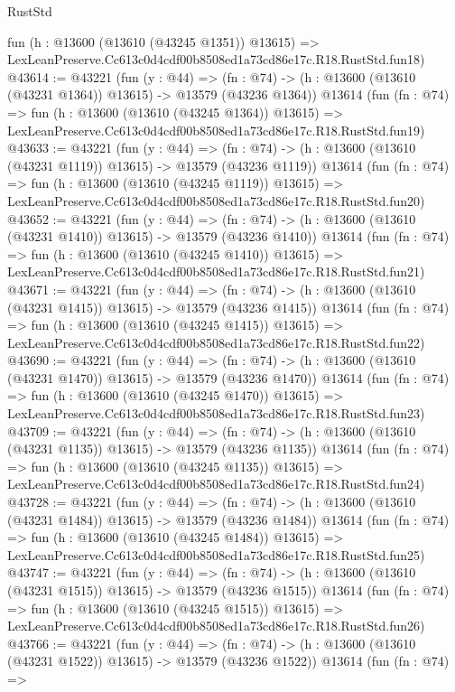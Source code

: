 \begin{lexlean}{RustStd}
\begin{coremodule}
    fun (h : @13600 (@13610 (@43245 @1351)) @13615) =>
    LexLeanPreserve.Cc613c0d4cdf00b8508ed1a73cd86e17c.R18.RustStd.fun18)
@43614 := @43221
    (fun (y : @44) =>
    (fn : @74) -> (h : @13600 (@13610 (@43231 @1364)) @13615) -> @13579 (@43236 @1364))
    @13614
    (fun (fn : @74) =>
    fun (h : @13600 (@13610 (@43245 @1364)) @13615) =>
    LexLeanPreserve.Cc613c0d4cdf00b8508ed1a73cd86e17c.R18.RustStd.fun19)
@43633 := @43221
    (fun (y : @44) =>
    (fn : @74) -> (h : @13600 (@13610 (@43231 @1119)) @13615) -> @13579 (@43236 @1119))
    @13614
    (fun (fn : @74) =>
    fun (h : @13600 (@13610 (@43245 @1119)) @13615) =>
    LexLeanPreserve.Cc613c0d4cdf00b8508ed1a73cd86e17c.R18.RustStd.fun20)
@43652 := @43221
    (fun (y : @44) =>
    (fn : @74) -> (h : @13600 (@13610 (@43231 @1410)) @13615) -> @13579 (@43236 @1410))
    @13614
    (fun (fn : @74) =>
    fun (h : @13600 (@13610 (@43245 @1410)) @13615) =>
    LexLeanPreserve.Cc613c0d4cdf00b8508ed1a73cd86e17c.R18.RustStd.fun21)
@43671 := @43221
    (fun (y : @44) =>
    (fn : @74) -> (h : @13600 (@13610 (@43231 @1415)) @13615) -> @13579 (@43236 @1415))
    @13614
    (fun (fn : @74) =>
    fun (h : @13600 (@13610 (@43245 @1415)) @13615) =>
    LexLeanPreserve.Cc613c0d4cdf00b8508ed1a73cd86e17c.R18.RustStd.fun22)
@43690 := @43221
    (fun (y : @44) =>
    (fn : @74) -> (h : @13600 (@13610 (@43231 @1470)) @13615) -> @13579 (@43236 @1470))
    @13614
    (fun (fn : @74) =>
    fun (h : @13600 (@13610 (@43245 @1470)) @13615) =>
    LexLeanPreserve.Cc613c0d4cdf00b8508ed1a73cd86e17c.R18.RustStd.fun23)
@43709 := @43221
    (fun (y : @44) =>
    (fn : @74) -> (h : @13600 (@13610 (@43231 @1135)) @13615) -> @13579 (@43236 @1135))
    @13614
    (fun (fn : @74) =>
    fun (h : @13600 (@13610 (@43245 @1135)) @13615) =>
    LexLeanPreserve.Cc613c0d4cdf00b8508ed1a73cd86e17c.R18.RustStd.fun24)
@43728 := @43221
    (fun (y : @44) =>
    (fn : @74) -> (h : @13600 (@13610 (@43231 @1484)) @13615) -> @13579 (@43236 @1484))
    @13614
    (fun (fn : @74) =>
    fun (h : @13600 (@13610 (@43245 @1484)) @13615) =>
    LexLeanPreserve.Cc613c0d4cdf00b8508ed1a73cd86e17c.R18.RustStd.fun25)
@43747 := @43221
    (fun (y : @44) =>
    (fn : @74) -> (h : @13600 (@13610 (@43231 @1515)) @13615) -> @13579 (@43236 @1515))
    @13614
    (fun (fn : @74) =>
    fun (h : @13600 (@13610 (@43245 @1515)) @13615) =>
    LexLeanPreserve.Cc613c0d4cdf00b8508ed1a73cd86e17c.R18.RustStd.fun26)
@43766 := @43221
    (fun (y : @44) =>
    (fn : @74) -> (h : @13600 (@13610 (@43231 @1522)) @13615) -> @13579 (@43236 @1522))
    @13614
    (fun (fn : @74) =>

\end{coremodule}
\end{lexlean}
